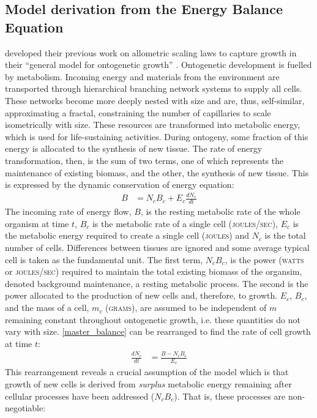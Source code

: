 \documentclass[a4paper]{article} %
\begin{document}
\subsection{Model derivation from the Energy Balance Equation}
\textcite{West2001} developed their previous work on allometric scaling laws \autocite{West1997} to capture growth in their ``general model for ontogenetic growth'' \autocite{West2001}. Ontogenetic development is fuelled by metabolism. Incoming energy and materials from the environment are transported through hierarchical branching network systems to supply all cells. These networks become more deeply nested with size and are, thus, self-similar, approximating a fractal, constraining the number of capillaries to scale isometrically with size. These resources are transformed into metabolic energy, which is used for life-sustaining activities. During ontogeny, some fraction of this energy is allocated to the synthesis of new tissue. The rate of energy transformation, then, is the sum of two terms, one of which represents the maintenance of existing biomass, and the other, the synthesis of new tissue. This is expressed by the dynamic conservation of energy equation:
\begin{align}
    B &= N_{c}B_{c} + E_{c}\frac{dN_{c}}{dt} \label{master_balance}
\end{align}
The incoming rate of energy flow, $B$, is the resting metabolic rate of the whole organism at time $t$, $B_c$ is the metabolic rate of a single cell (\textsc{joules/sec}), $E_c$ is the metabolic energy required to create a single cell (\textsc{joules}) and $N_c$ is the total number of cells. Differences between tissues are ignored and some average typical cell is taken as the fundamental unit. The first term, $N_{c}B_{c}$, is the power (\textsc{watts} or \textsc{joules/sec}) required to maintain the total existing biomass of the organsim, denoted background maintenance, a resting metabolic process. The second is the power allocated to the production of new cells and, therefore, to growth. $E_c$, $B_c$, and the mass of a cell, $m_c$ (\textsc{grams}), are assumed to be independent of $m$ remaining constant throughout ontogenetic growth, i.e. these quantities do not vary with size. \cref{master_balance} can be rearranged to find the rate of cell growth at time $t$: 
\begin{align}
    \frac{dN_{c}}{dt} &= \frac{B - N_{c}B_{c}}{E_{c}} \label{cell_rate}
\end{align}
This rearrangement reveals a crucial assumption of the model which is that growth of new cells is derived from \textit{surplus} metabolic energy remaining after cellular processes have been addressed ($N_{c}B_{c}$). That is, these processes are non-negotiable:
\end{document}
